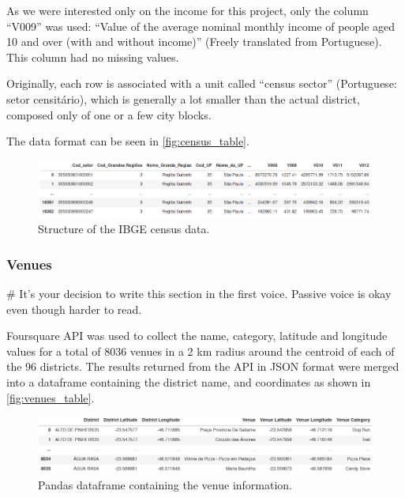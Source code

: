 \documentclass[12pt]{article}
\begin{document}
As we were interested only on the income for this project, only the column ``V009'' was used:
``Value of the average nominal monthly income of people aged 10 and over (with and without income)'' (Freely translated from Portuguese). This column had no missing values.

Originally, each row is associated with a unit called ``census sector''
(Portuguese: setor censitário), which is generally a lot smaller than the actual
district, composed only of one or a few city blocks.

The data format can be seen in \autoref{fig:census_table}.

\begin{figure}[h]
        \centering
        \includegraphics[width=\linewidth]{census_table.png}
        \caption{Structure of the IBGE census data.\label{fig:census_table}}
\end{figure}

\subsubsection{Venues}

# It's your decision to write this section in the first voice. Passive voice is okay even though harder to read.

Foursquare API was used to collect the name, category, latitude and longitude
values for a total of 8036 venues in a 2 km radius around the centroid of each
of the 96 districts. The results returned from the API in JSON format were
merged into a dataframe containing the district name, and coordinates as shown
in \autoref{fig:venues_table}.

\begin{figure}[h]
        \centering
        \includegraphics[width=\linewidth]{venues_table.png}
        \caption{Pandas dataframe containing the venue information.\label{fig:venues_table}}
\end{figure}
\end{document}
